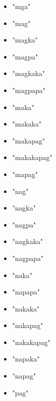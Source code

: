 \documentclass[journal]{./IEEE/IEEEtran}
\begin{document}
\begin{multicols}{3}
    \begin{itemize}
      \item "mga" \\
      \item "mag" \\
      \item "magka" \\
      \item "magpa" \\
      \item "magkaka" \\
      \item "magpapa" \\
      \item "maka" \\
      \item "makaka" \\
      \item "makapag" \\
      \item "makakapag" \\
      \item "mapag" \\ 
      \item "nag" \\
      \item "nagka" \\
      \item "nagpa" \\
      \item "nagkaka" \\
      \item "nagpapa" \\
      \item "naka" \\
      \item "napapa" \\
      \item "nakaka" \\
      \item "nakapag" \\
      \item "nakakapag" \\
      \item "napaka" \\
      \item "napag" \\
      \item "pag" \\

\end{itemize}
\end{multicols}
\end{document}

